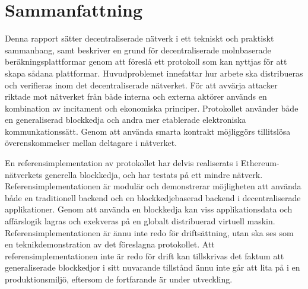 
\thispagestyle{plain}			%
\section*{Sammanfattning}
Denna rapport sätter decentraliserade nätverk i ett tekniskt och praktiskt sammanhang, samt beskriver en grund för decentraliserade molnbaserade beräkningsplattformar genom att föreslå ett protokoll som kan nyttjas för att skapa sådana plattformar. Huvudproblemet innefattar hur arbete ska distribueras och verifieras inom det decentraliserade nätverket. För att avvärja attacker riktade mot nätverket från både interna och externa aktörer används en kombination av incitament och ekonomiska principer. Protokollet använder både en generaliserad blockkedja och andra mer etablerade elektroniska kommunkationssätt. Genom att använda smarta kontrakt möjliggörs tillitslösa överenskommelser mellan deltagare i nätverket.

En referensimplementation av protokollet har delvis realiserats i Ethereum-nätverkets generella blockkedja, och har testats på ett mindre nätverk. Referensimplementationen är modulär och demonstrerar möjligheten att använda både en traditionell backend och en blockkedjebaserad backend i decentraliserade applikationer. Genom att använda en blockkedja kan viss applikationsdata och affärslogik lagras och exekveras på en globalt distribuerad virtuell maskin. Referensimplementationen är ännu inte redo för driftsättning, utan ska ses som en teknikdemonstration av det föreslagna protokollet. Att referensimplementationen inte är redo för drift kan tillskrivas det faktum att generaliserade blockkedjor i sitt nuvarande tillstånd ännu inte går att lita på i en produktionsmiljö, eftersom de fortfarande är under utveckling.

\newpage				%
\thispagestyle{empty}
\mbox{}